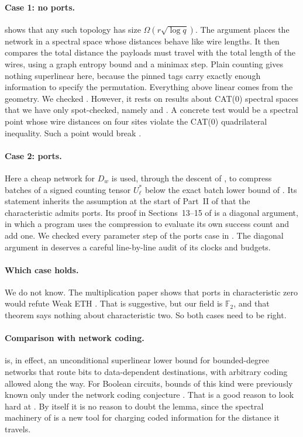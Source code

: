 \documentclass[11pt]{article}
\theoremstyle{definition}
\theoremstyle{remark}
\newcommand{\F}{\mathbb{F}}
\begin{document}
\paragraph{Case 1: no ports.}
\cite[Lemma~4.1]{OAI} shows that any such topology has size
$\Omega(r\sqrt{\log q})$. The argument places the network in a spectral
space whose distances behave like wire lengths. It then compares the
total distance the payloads must travel with the total length of the
wires, using a graph entropy bound \cite[Corollary~5.2]{HC} and a minimax
step. Plain counting gives nothing superlinear here, because the pinned
tags carry exactly enough information to specify the permutation.
Everything above linear comes from the geometry. We checked
\cite[Lemma~4.1]{OAI}. However, it rests on results about CAT(0)
spectral spaces that we have only spot-checked, namely
\cite[Theorem~4.3]{Geom} and \cite[Theorems~4.2, 5.1 and~6.1]{HC}. A
concrete test would be a spectral point whose wire distances on four
sites violate the CAT(0) quadrilateral inequality. Such a point would
break \cite[Lemma~4.1]{OAI}.

\paragraph{Case 2: ports.}
Here a cheap network for $D_w$ is used, through the descent of
\cite[Proposition~14.1]{Geom}, to compress batches of a signed counting
tensor $U^*_\ell$ below the exact batch lower bound of
\cite[Theorem~12.1]{HC}. Its statement inherits the assumption at the
start of Part~II of \cite{HC} that the characteristic admits ports.
Its proof in Sections~13--15 of \cite{HC} is a
diagonal argument, in which a program uses the compression to evaluate
its own success count and add one. We checked every parameter step of
the ports case in \cite{OAI}. The diagonal argument in \cite{HC} deserves
a careful line-by-line audit of its clocks and budgets.

\paragraph{Which case holds.}
We do not know. The multiplication paper shows that ports in
characteristic zero would refute Weak ETH \cite[Theorem~7.1]{Mult}. That
is suggestive, but our field is $\F_2$, and that theorem says nothing
about characteristic two. So both cases need to be right.

\paragraph{Comparison with network coding.}
\cite[Lemma~4.1]{OAI} is, in effect, an unconditional superlinear lower
bound for bounded-degree networks that route bits to data-dependent
destinations, with arbitrary coding allowed along the way. For Boolean
circuits, bounds of this kind were previously known only under the
network coding conjecture \cite{AFKL}. That is a good reason to look hard
at \cite[Lemma~4.1]{OAI}. By itself it is no reason to doubt the lemma,
since the spectral machinery of \cite{Geom} is a new tool for charging
coded information for the distance it travels.
\end{document}
